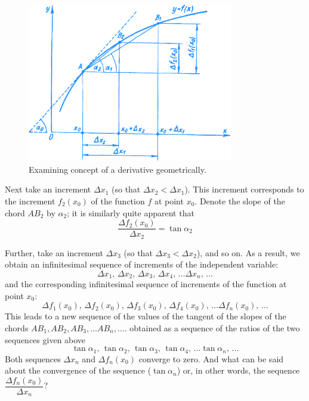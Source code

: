 \begin{figure}[!ht]%
\centering
\includegraphics[width=0.8\textwidth]{figures/fig-38.pdf}
\caption{Examining concept of a derivative geometrically.}
\label{fig-38}
\end{figure}

Next take an increment $\Delta x_{1}$ (so that $\Delta x_{2}< \Delta x_{1}$). This increment corresponds to the increment $f_{2}(x_{0})$ of the function $f$ at point $x_{0}$. Denote the slope of the chord $AB_{2}$ by $\alpha_{2}$; it is similarly quite apparent that 
\begin{equation*}%
\frac{\Delta f_{2}(x_{0})}{\Delta x_{2}}  = \tan \alpha_{2}
\end{equation*}


Further, take an increment $\Delta x_{3}$ (so that $\Delta x_{3}< \Delta x_{2}$), and so on. As a result, we obtain an infinitesimal sequence of increments of the independent variable:
\begin{equation*}%
\Delta x_{1}, \, \Delta x_{2},  \,  \Delta x_{3},  \, \Delta x_{4},  \, \ldots \Delta x_{n},  \, \ldots
\end{equation*}
and the corresponding infinitesimal sequence of increments of the function at point $x_{0}$: 
\begin{equation*}%
\Delta f_{1} (x_{0}),  \, \Delta f_{2} (x_{0}),  \, \Delta f_{3} (x_{0}),  \, \Delta f_{4} (x_{0}),  \, \ldots \Delta f_{n} (x_{0}),  \, \ldots
\end{equation*}
This leads to a new sequence of the values of the tangent of the slopes of the chords $AB_{1}, AB_{2}, AB_{3}, \ldots AB_{n}, \ldots$. obtained as a sequence of the ratios of the two sequences given above
\begin{equation}%
\tan \alpha_{1},  \, \tan \alpha_{2},  \, \tan \alpha_{3},  \, \tan \alpha_{4},  \, \dots \tan \alpha_{n},   \, \ldots 
\label{geom-defn-derivative}
\end{equation}
Both sequences $\Delta x_{n}$ and $\Delta f_{n} (x_{0})$ converge to zero. And what can be said about the convergence of the sequence ($\tan \alpha_{n}$) or, in other words, the sequence $\dfrac{\Delta f_{n} (x_{0})}{\Delta x_{n}}$?

